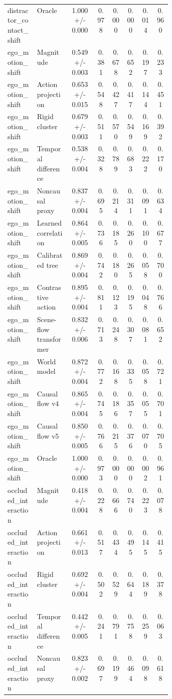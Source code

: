 \documentclass{article}
\begin{document}
\begin{center}
\begin{longtable}{p{0.18\linewidth}p{0.20\linewidth}cccccc}
distractor\_contact\_shift & Oracle & 1.000 +/- 0.000 & 0.978 & 0.000 & 0.000 & 0.014 & 0.960\\
ego\_motion\_shift & Magnitude & 0.549 +/- 0.003 & 0.381 & 0.678 & 0.652 & 0.197 & 0.233\\
ego\_motion\_shift & Action projection & 0.653 +/- 0.015 & 0.548 & 0.427 & 0.417 & 0.144 & 0.451\\
ego\_motion\_shift & Rigid cluster & 0.679 +/- 0.003 & 0.511 & 0.570 & 0.549 & 0.169 & 0.392\\
ego\_motion\_shift & Temporal difference & 0.538 +/- 0.004 & 0.328 & 0.789 & 0.683 & 0.222 & 0.170\\
ego\_motion\_shift & Noncausal proxy & 0.837 +/- 0.004 & 0.695 & 0.214 & 0.311 & 0.091 & 0.634\\
ego\_motion\_shift & Learned correlation & 0.864 +/- 0.005 & 0.736 & 0.185 & 0.260 & 0.100 & 0.677\\
ego\_motion\_shift & Calibrated tree & 0.869 +/- 0.004 & 0.742 & 0.180 & 0.265 & 0.058 & 0.700\\
ego\_motion\_shift & Contrastive action & 0.895 +/- 0.004 & 0.811 & 0.123 & 0.195 & 0.048 & 0.766\\
ego\_motion\_shift & Scene-flow transformer & 0.832 +/- 0.006 & 0.713 & 0.248 & 0.307 & 0.081 & 0.652\\
ego\_motion\_shift & World model & 0.872 +/- 0.004 & 0.772 & 0.168 & 0.335 & 0.058 & 0.721\\
ego\_motion\_shift & Causal flow v4 & 0.865 +/- 0.004 & 0.745 & 0.186 & 0.357 & 0.055 & 0.701\\
ego\_motion\_shift & Causal flow v5 & 0.850 +/- 0.005 & 0.766 & 0.215 & 0.376 & 0.070 & 0.705\\
ego\_motion\_shift & Oracle & 1.000 +/- 0.000 & 0.973 & 0.000 & 0.000 & 0.002 & 0.961\\
occluded\_interaction & Magnitude & 0.418 +/- 0.004 & 0.228 & 0.666 & 0.740 & 0.223 & 0.078\\
occluded\_interaction & Action projection & 0.661 +/- 0.013 & 0.517 & 0.434 & 0.495 & 0.145 & 0.415\\
occluded\_interaction & Rigid cluster & 0.692 +/- 0.004 & 0.502 & 0.529 & 0.644 & 0.189 & 0.378\\
occluded\_interaction & Temporal difference & 0.442 +/- 0.005 & 0.241 & 0.791 & 0.758 & 0.259 & 0.063\\
occluded\_interaction & Noncausal proxy & 0.823 +/- 0.002 & 0.697 & 0.199 & 0.464 & 0.098 & 0.618\\

\end{longtable}
\end{center}
\end{document}
